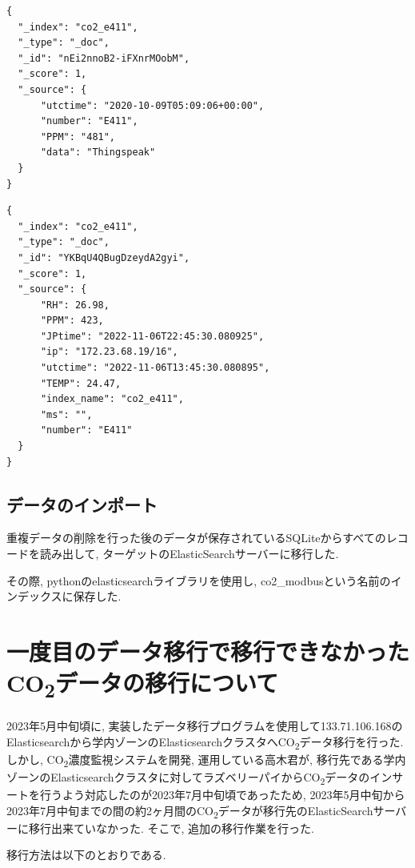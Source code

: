 \begin{lstlisting}[caption=\_sourceフィールドのメンバー数が少ないドキュメント, label=sc1]
{
  "_index": "co2_e411",
  "_type": "_doc",
  "_id": "nEi2nnoB2-iFXnrMOobM",
  "_score": 1,
  "_source": {
      "utctime": "2020-10-09T05:09:06+00:00",
      "number": "E411",
      "PPM": "481",
      "data": "Thingspeak"
  }
}
  \end{lstlisting}

\begin{lstlisting}[caption=\_sourceフィールドのメンバー数が多いドキュメント, label=sc2]
{
  "_index": "co2_e411",
  "_type": "_doc",
  "_id": "YKBqU4QBugDzeydA2gyi",
  "_score": 1,
  "_source": {
      "RH": 26.98,
      "PPM": 423,
      "JPtime": "2022-11-06T22:45:30.080925",
      "ip": "172.23.68.19/16",
      "utctime": "2022-11-06T13:45:30.080895",
      "TEMP": 24.47,
      "index_name": "co2_e411",
      "ms": "",
      "number": "E411"
  }
}
    \end{lstlisting}

\subsection{データのインポート}
重複データの削除を行った後のデータが保存されているSQLiteからすべてのレコードを読み出して, ターゲットのElasticSearchサーバーに移行した.

その際, pythonのelasticsearchライブラリを使用し, co2\_modbusという名前のインデックスに保存した.

\section{一度目のデータ移行で移行できなかったCO\textsubscript{2}データの移行について}

2023年5月中旬頃に, 実装したデータ移行プログラムを使用して133.71.106.168のElasticsearchから学内ゾーンのElasticsearchクラスタへCO\textsubscript{2}データ移行を行った. しかし, CO\textsubscript{2}濃度監視システムを開発, 運用している高木君が, 移行先である学内ゾーンのElasticsearchクラスタに対してラズベリーパイからCO\textsubscript{2}データのインサートを行うよう対応したのが2023年7月中旬頃であったため, 2023年5月中旬から2023年7月中旬までの間の約2ヶ月間のCO\textsubscript{2}データが移行先のElasticSearchサーバーに移行出来ていなかった. そこで, 追加の移行作業を行った.

移行方法は以下のとおりである.

